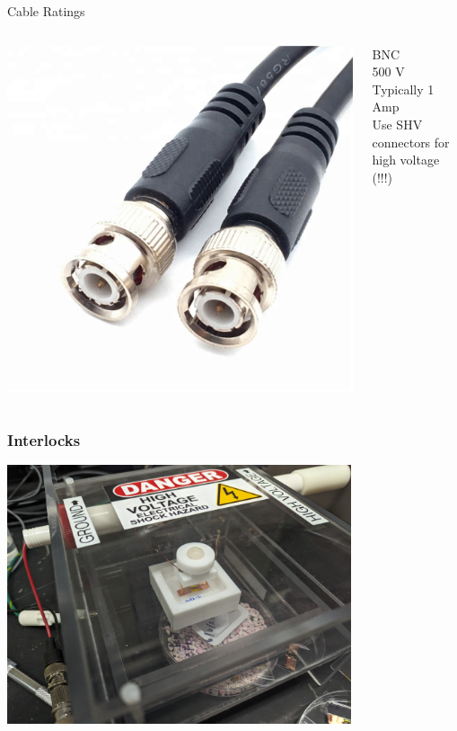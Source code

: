 \documentclass{presentation}
\begin{document}
\begin{frame}{Cable Ratings}
  \begin{columns}
    \begin{column}{0.33\textwidth}
      \includegraphics[width=\textwidth]{"./HTB1je_xKXGWBuNjy0Fbq6z4sXXad.jpg"}
    \end{column}
    \begin{column}{0.67\textwidth}
      BNC
      \\
      500 V
      \\
      Typically 1 Amp
      \\
      Use SHV connectors for high voltage (!!!)
    \end{column}
  \end{columns}
\end{frame}

\begin{frame}\frametitle{Interlocks}
  \centering
  \includegraphics[height=3in]{"./hv.jpg"}
\end{frame}
\end{document}
